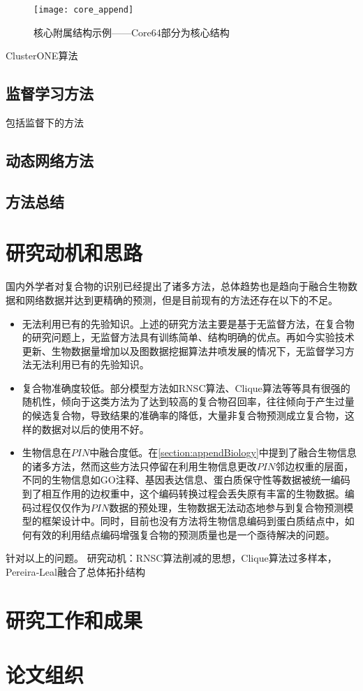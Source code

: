 \begin{figure}[htbp]
  \centering
  \texttt{[image: core\_append]}
  \caption{核心附属结构示例——Core64部分为核心结构}
  \label{fig:core_append}
\end{figure}

ClusterONE算法\cite{nepusz_detecting_2012}
\subsection{监督学习方法}
\label{section:Supervision}
包括监督下的方法
\subsection{动态网络方法}
\label{section:Dynamic}


\subsection{方法总结}
\label{section:researchSummary}

\section{研究动机和思路}
\label{section:motivation}

国内外学者对复合物的识别已经提出了诸多方法，总体趋势也是趋向于融合生物数据和网络数据并达到更精确的预测，但是目前现有的方法还存在以下的不足。
\begin{itemize}
  \item 无法利用已有的先验知识。上述的研究方法主要是基于无监督方法，在复合物的研究问题上，无监督方法具有训练简单、结构明确的优点。再如今实验技术更新、生物数据量增加以及图数据挖掘算法井喷发展的情况下，无监督学习方法无法利用已有的先验知识。
  \item 复合物准确度较低。部分模型方法如RNSC算法\cite{king_protein_2004}、Clique算法\cite{spirin_protein_2003}等等具有很强的随机性，倾向于这类方法为了达到较高的复合物召回率，往往倾向于产生过量的候选复合物，导致结果的准确率的降低，大量非复合物预测成立复合物，这样的数据对以后的使用不好。
  \item 生物信息在$PIN$中融合度低。在\ref{section:appendBiology}中提到了融合生物信息的诸多方法，然而这些方法只停留在利用生物信息更改$PIN$邻边权重的层面，不同的生物信息如GO注释、基因表达信息、蛋白质保守性等数据被统一编码到了相互作用的边权重中，这个编码转换过程会丢失原有丰富的生物数据。编码过程仅仅作为$PIN$数据的预处理，生物数据无法动态地参与到复合物预测模型的框架设计中。同时，目前也没有方法将生物信息编码到蛋白质结点中，如何有效的利用结点编码增强复合物的预测质量也是一个亟待解决的问题。
\end{itemize}

针对以上的问题。
研究动机：RNSC算法\cite{king_protein_2004}削减的思想，Clique算法\cite{spirin_protein_2003}过多样本，Pereira‐Leal\cite{pereiraleal_detection_2004}融合了总体拓扑结构
\section{研究工作和成果}
\label{section:workandresult}

\section{论文组织}
\label{section:organization}